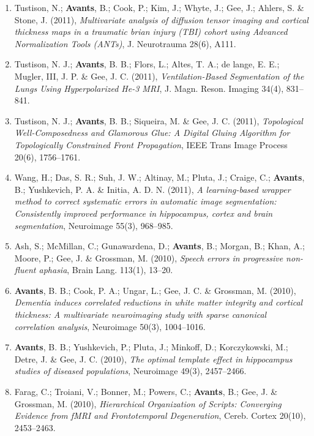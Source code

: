 \documentclass[11pt]{moderncv} %
\begin{document}
\begin{enumerate}
\item  Tustison, N.; \textbf{Avants}, B.; Cook, P.; Kim, J.; Whyte, J.; Gee, J.; Ahlers, S. \&  Stone, J. (2011), \textit{Multivariate analysis of diffusion tensor imaging and cortical thickness maps in a traumatic brian injury (TBI) cohort using Advanced Normalization Tools (ANTs)}, J. Neurotrauma 28(6), A111.

\item  Tustison, N. J.; \textbf{Avants}, B. B.; Flors, L.; Altes, T. A.; de lange, E. E.; Mugler, III, J. P. \&  Gee, J. C. (2011), \textit{Ventilation-Based Segmentation of the Lungs Using Hyperpolarized He-3 MRI}, J. Magn. Reson. Imaging 34(4), 831--841.

\item  Tustison, N. J.; \textbf{Avants}, B. B.; Siqueira, M. \&  Gee, J. C. (2011), \textit{Topological Well-Composedness and Glamorous Glue: A Digital Gluing Algorithm for Topologically Constrained Front Propagation}, IEEE Trans Image Process 20(6), 1756--1761.

\item  Wang, H.; Das, S. R.; Suh, J. W.; Altinay, M.; Pluta, J.; Craige, C.; \textbf{Avants}, B.; Yushkevich, P. A. \&  Initia, A. D. N. (2011), \textit{A learning-based wrapper method to correct systematic errors in automatic image segmentation: Consistently improved performance in hippocampus, cortex and brain segmentation}, Neuroimage 55(3), 968--985.

\item  Ash, S.; McMillan, C.; Gunawardena, D.; \textbf{Avants}, B.; Morgan, B.; Khan, A.; Moore, P.; Gee, J. \&  Grossman, M. (2010), \textit{Speech errors in progressive non-fluent aphasia}, Brain Lang. 113(1), 13--20.

\item  \textbf{Avants}, B. B.; Cook, P. A.; Ungar, L.; Gee, J. C. \&  Grossman, M. (2010), \textit{Dementia induces correlated reductions in white matter integrity and cortical thickness: A multivariate neuroimaging study with sparse canonical correlation analysis}, Neuroimage 50(3), 1004--1016.

\item  \textbf{Avants}, B. B.; Yushkevich, P.; Pluta, J.; Minkoff, D.; Korczykowski, M.; Detre, J. \&  Gee, J. C. (2010), \textit{The optimal template effect in hippocampus studies of diseased populations}, Neuroimage 49(3), 2457--2466.

\item  Farag, C.; Troiani, V.; Bonner, M.; Powers, C.; \textbf{Avants}, B.; Gee, J. \&  Grossman, M. (2010), \textit{Hierarchical Organization of Scripts: Converging Evidence from fMRI and Frontotemporal Degeneration}, Cereb. Cortex 20(10), 2453--2463.


\end{enumerate}
\end{document}
